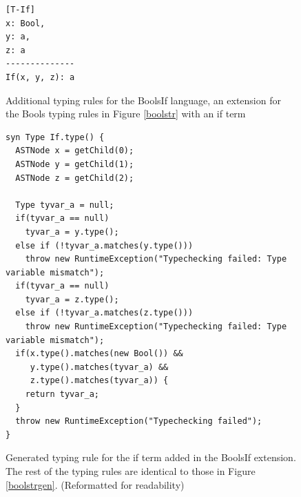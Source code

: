 \documentclass[nofilelist]{cslthse-msc}
\newcommand{\CR}[1]{\textcolor{green!60!black}{[\textbf{CR}:#1]}}
\begin{document}
\begin{figure}[]
\begin{lstlisting}[]
[T-If]
x: Bool,
y: a,
z: a
--------------
If(x, y, z): a
\end{lstlisting}
  \caption{Additional typing rules for the BoolsIf language, an extension for the Bools typing rules in Figure \ref{boolstr} with an if term}
  \label{iftr}
\end{figure}
\begin{figure}[]
\begin{lstlisting}[language=jrag]
syn Type If.type() {
  ASTNode x = getChild(0);
  ASTNode y = getChild(1);
  ASTNode z = getChild(2);

  Type tyvar_a = null;
  if(tyvar_a == null)
    tyvar_a = y.type();
  else if (!tyvar_a.matches(y.type()))
    throw new RuntimeException("Typechecking failed: Type variable mismatch");
  if(tyvar_a == null)
    tyvar_a = z.type();
  else if (!tyvar_a.matches(z.type()))
    throw new RuntimeException("Typechecking failed: Type variable mismatch");
  if(x.type().matches(new Bool()) &&
     y.type().matches(tyvar_a) &&
     z.type().matches(tyvar_a)) {
    return tyvar_a;
  }
  throw new RuntimeException("Typechecking failed");
}
\end{lstlisting}
\caption{Generated typing rule for the if term added in the BoolsIf extension. The rest of the typing rules are identical to those in Figure \ref{boolstrgen}. (Reformatted for readability)
}
  \label{iftrgen}
\end{figure}
\end{document}
